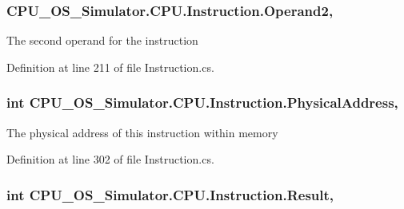 \subsubsection[{Operand2}]{ C\+P\+U\+\_\+\+O\+S\+\_\+\+Simulator.\+C\+P\+U.\+Instruction.\+Operand2\hspace{0.3cm}{\ttfamily [get]}, {\ttfamily [set]}}\label{class_c_p_u___o_s___simulator_1_1_c_p_u_1_1_instruction_ab35e6667e7c2f42dd09965995e25ff2d}


The second operand for the instruction 



Definition at line 211 of file Instruction.\+cs.

\hypertarget{class_c_p_u___o_s___simulator_1_1_c_p_u_1_1_instruction_a97b20c8a0a7536bdddd8e791605a8bac}{}
\subsubsection[{Physical\+Address}]{\setlength{\rightskip}{0pt plus 5cm}int C\+P\+U\+\_\+\+O\+S\+\_\+\+Simulator.\+C\+P\+U.\+Instruction.\+Physical\+Address\hspace{0.3cm}{\ttfamily [get]}, {\ttfamily [set]}}\label{class_c_p_u___o_s___simulator_1_1_c_p_u_1_1_instruction_a97b20c8a0a7536bdddd8e791605a8bac}


The physical address of this instruction within memory 



Definition at line 302 of file Instruction.\+cs.

\hypertarget{class_c_p_u___o_s___simulator_1_1_c_p_u_1_1_instruction_a8e0f7c63850af7cfd8a41c066c01838e}{}
\subsubsection[{Result}]{\setlength{\rightskip}{0pt plus 5cm}int C\+P\+U\+\_\+\+O\+S\+\_\+\+Simulator.\+C\+P\+U.\+Instruction.\+Result\hspace{0.3cm}{\ttfamily [get]}, {\ttfamily [set]}}\label{class_c_p_u___o_s___simulator_1_1_c_p_u_1_1_instruction_a8e0f7c63850af7cfd8a41c066c01838e}


